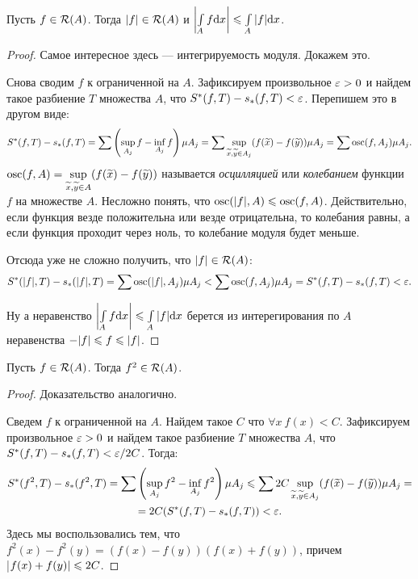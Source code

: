 \begin{Statement}
Пусть $f \in \mathcal{R}(A)$. Тогда $|f| \in \mathcal{R}(A)$ и $\left|\int\limits_A f\mathrm{d}x \right| \leqslant \int\limits_A |f|\mathrm{d}x$.
\end{Statement}
\begin{proof}
Самое интересное здесь --- интегрируемость модуля. Докажем это.

Снова сводим $f$ к ограниченной на $A$. Зафиксируем произвольное $\varepsilon > 0$ и найдем такое разбиение $T$ множества $A$, что $S^*(f, T) - s_*(f, T) < \varepsilon$. Перепишем это в другом виде:
\begin{gather*}
S^*(f, T) - s_*(f, T) =  \sum\left( \sup\limits_{A_j}f - \inf\limits_{A_j}f \right)\mu A_j = \sum\sup\limits_{\widetilde{x}, \widetilde{y} \in A_j}(f(\widetilde{x}) - f(\widetilde{y})) \mu A_j = \sum\mathrm{osc}(f, A_j)\mu A_j.
\end{gather*}
$\mathrm{osc}(f, A) = \sup\limits_{\widetilde{x}, \widetilde{y} \in A}(f(\widetilde{x}) - f(\widetilde{y}))$ называется \textit{осцилляцией} или \textit{колебанием} функции $f$ на  множестве $A$. Несложно понять, что $\mathrm{osc}(|f|, A) \leqslant \mathrm{osc}(f, A)$. Действительно, если функция везде положительна или везде отрицательна, то колебания равны, а если функция проходит через ноль, то колебание модуля будет меньше.

Отсюда уже не сложно получить, что $|f| \in \mathcal{R}(A)$:
\begin{gather*}
S^*(|f|, T) - s_*(|f|, T) =  \sum\mathrm{osc}(|f|, A_j)\mu A_j < \sum\mathrm{osc}(f, A_j)\mu A_j = S^*(f, T) - s_*(f, T) < \varepsilon.
\end{gather*}

Ну а неравенство $\left|\int\limits_A f\mathrm{d}x \right| \leqslant \int\limits_A |f|\mathrm{d}x$ берется из интерегирования по $A$ неравенства $-|f| \leq f\hm\leq|f|$.
\end{proof}

\begin{Statement}
Пусть $f \in \mathcal{R}(A)$. Тогда $f^2 \in \mathcal{R}(A)$.
\end{Statement}
\begin{proof}
Доказательство аналогично.

Сведем $f$ к ограниченной на $A$. Найдем такое $C$ что $\forall x\ f(x) < C$. Зафиксируем произвольное $\varepsilon > 0$ и найдем такое разбиение $T$ множества $A$, что $S^*(f, T) - s_*(f, T) < \varepsilon / 2C$. Тогда:
\begin{gather*}
S^*(f^2, T) - s_*(f^2, T) = \sum\left( \sup\limits_{A_j}f^2 - \inf\limits_{A_j}f^2 \right)\mu A_j \leqslant \sum 2C\sup\limits_{\widetilde{x}, \widetilde{y} \in A_j}(f(\widetilde{x}) - f(\widetilde{y}))\mu A_j =\\= 2C (S^*(f, T) - s_*(f, T)) < \varepsilon.
\end{gather*}
Здесь мы воспользовались тем, что $f^2(x) - f^2(y) = (f(x) - f(y))(f(x) + f(y))$, причем\\|$f(x) + f(y)| \hm\leq 2C$.
\end{proof}

